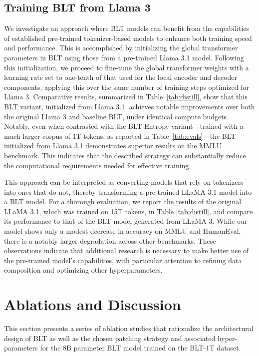 \subsection{Training {\textsc BLT} from Llama 3}
\label{sec:distillation}
We investigate an approach where {\textsc BLT} models can benefit from the capabilities of established pre-trained tokenizer-based models to enhance both training speed and performance. This is accomplished by initializing the global transformer parameters in {\textsc BLT} using those from a pre-trained Llama 3.1 model. Following this initialization, we proceed to fine-tune the global transformer weights with a learning rate set to one-tenth of that used for the local encoder and decoder components, applying this over the same number of training steps optimized for Llama 3. Comparative results, summarized in Table~\ref{tab:distill}, show that this {\textsc BLT} variant, initialized from Llama 3.1, achieves notable improvements over both the original Llama 3 and baseline {\textsc BLT}, under identical compute budgets. Notably, even when contrasted with the {\textsc BLT}-Entropy variant—trained with a much larger corpus of 1T tokens, as reported in Table~\ref{tab:evals}—the {\textsc BLT} initialized from Llama 3.1 demonstrates superior results on the MMLU benchmark. This indicates that the described strategy can substantially reduce the computational requirements needed for effective training.

This approach can be interpreted as converting models that rely on tokenizers into ones that do not, thereby transforming a pre-trained LLaMA 3.1 model into a {\textsc BLT} model. For a thorough evaluation, we report the results of the original LLaMA 3.1, which was trained on 15T tokens, in Table \ref{tab:distill}, and compare its performance to that of the {\textsc BLT} model generated from LLaMA 3. While our model shows only a modest decrease in accuracy on MMLU and HumanEval, there is a notably larger degradation across other benchmarks. These observations indicate that additional research is necessary to make better use of the pre-trained model's capabilities, with particular attention to refining data composition and optimizing other hyperparameters.

\section{Ablations and Discussion}
\label{section:ablations}
This section presents a series of ablation studies that rationalize the architectural design of {\textsc BLT} as well as the chosen patching strategy and associated hyper-parameters for the 8B parameter {\textsc BLT} model trained on the {\textsc BLT}-1T dataset.

